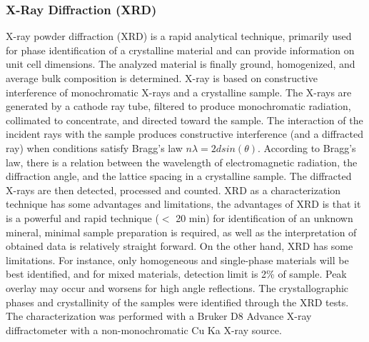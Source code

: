 \documentclass[reprint,amsmath,amssymb,aps,floatfix,
]{revtex4-2}
\begin{document}
\subsubsection{X-Ray Diffraction (XRD)}
X-ray powder diffraction (XRD) is a rapid analytical technique, primarily used for phase identification of a crystalline material and can provide information on unit cell dimensions. The analyzed material is finally ground, homogenized, and average bulk composition is determined. X-ray is based on constructive interference of monochromatic X-rays and a crystalline sample. The X-rays are generated by a cathode ray tube, filtered to produce monochromatic radiation, collimated to concentrate, and directed toward the sample. The interaction of the incident rays with the sample produces constructive interference (and a diffracted ray) when conditions satisfy Bragg's law $n\lambda=2dsin(\theta)$. According to Bragg's law, there is a relation between the wavelength of electromagnetic radiation, the diffraction angle, and the lattice spacing in a crystalline sample. The diffracted X-rays are then detected, processed and counted. XRD as a characterization technique has some advantages and limitations, the advantages of XRD is that it is a powerful and rapid technique ($<$ 20 min) for identification of an unknown mineral, minimal sample preparation is required, as well as the interpretation of obtained data is relatively straight forward. On the other hand, XRD has some limitations. For instance, only homogeneous and single-phase materials will be best identified, and for mixed materials, detection limit is 2\% of sample. Peak overlay may occur and worsens for high angle reflections. The crystallographic phases and crystallinity of the samples were identified through the XRD tests. The characterization was performed with a Bruker D8 Advance X-ray diffractometer with a non-monochromatic Cu Ka X-ray source.
\end{document}
